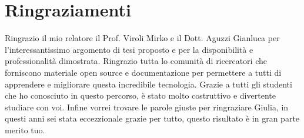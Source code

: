 \documentclass[12pt,a4paper,openright,twoside]{book}
\begin{document}
\chapter{Ringraziamenti}
Ringrazio il mio relatore il Prof. Viroli Mirko e il Dott. Aguzzi Gianluca per l'interessantissimo argomento di tesi proposto e per la disponibilità e professionalità dimostrata.
Ringrazio tutta lo comunità di ricercatori che forniscono materiale open source e documentazione per permettere a tutti di apprendere e migliorare questa incredibile tecnologia.
Grazie a tutti gli studenti che ho conosciuto in questo percorso, è stato molto costruttivo e divertente studiare con voi.
Infine vorrei trovare le parole giuste per ringraziare Giulia, in questi anni sei stata eccezzionale grazie per tutto, questo risultato è in gran parte merito tuo.






\backmatter

\nocite{*} %


%

\end{document}

